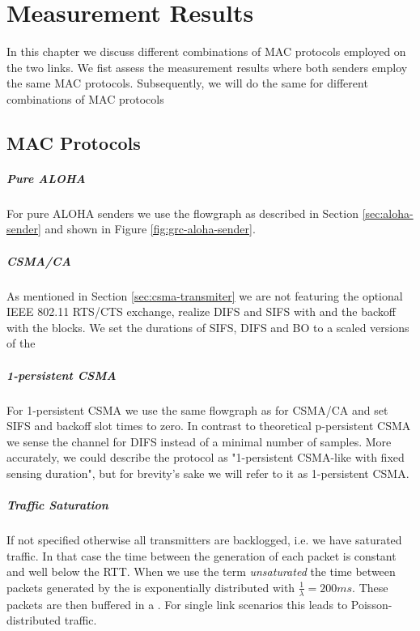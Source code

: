 \chapter{Measurement Results}

In this chapter we discuss different combinations of MAC protocols employed on the two links.  We fist assess the measurement results where both senders employ the same MAC protocols. Subsequently, we will do the same for different combinations of MAC protocols 

\section{MAC Protocols}

\paragraph{Pure ALOHA}
For pure ALOHA senders we use the flowgraph as described in Section \ref{sec:aloha-sender} and shown in Figure \ref{fig:grc-aloha-sender}. 

\paragraph{CSMA/CA}
As mentioned in Section \ref{sec:csma-transmiter} we are not featuring the optional IEEE 802.11 RTS/CTS exchange, realize DIFS and SIFS with  and the backoff with the  blocks. We set the durations of SIFS, DIFS and BO to a scaled versions of the 

\paragraph{1-persistent CSMA}
For 1-persistent CSMA we use the same flowgraph as for CSMA/CA and set SIFS and backoff slot times to zero. In contrast to theoretical p-persistent CSMA we sense the channel for DIFS instead of a minimal number of samples. More accurately, we could describe the protocol as "1-persistent CSMA-like with fixed sensing duration", but for brevity's sake we will refer to it as 1-persistent CSMA.  
 
\paragraph{Traffic Saturation}
If not specified otherwise all transmitters are backlogged, i.e. we have saturated traffic. In that case the time between the generation of each packet is constant and well below the RTT. When we use the term \emph{unsaturated} the time between packets generated by the  is exponentially distributed with $\frac{1}{\lambda}=200ms$. These packets are then buffered in a . For single link scenarios this leads to Poisson-distributed traffic. 

